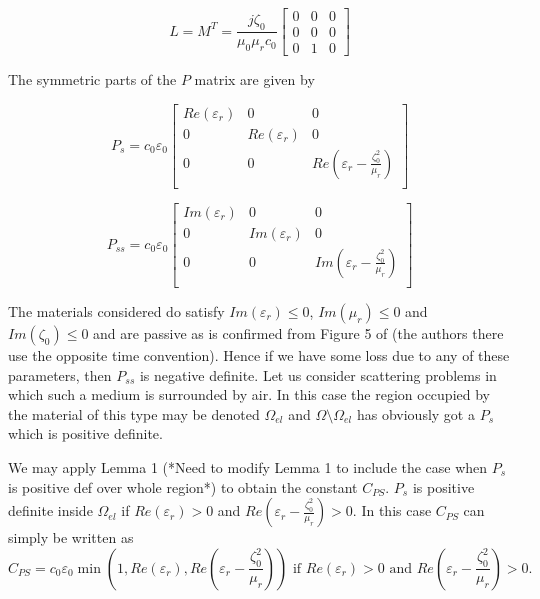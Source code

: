 \begin{equation} \label{constitutive_kraft_LM}
\tag{72}
L = M^T = \frac{j\zeta_0}{\mu_0\mu_rc_0}
\begin{bmatrix}
0 & 0 & 0 \\
0 & 0 & 0 \\
0 &  1  & 0
\end{bmatrix} 
\end{equation}

The symmetric parts of the $P$ matrix are given by 

\begin{equation}
\tag{73}
P_s =  c_0\varepsilon_0
\begin{bmatrix}
Re(\varepsilon_r) & 0 & 0 \\
0 & Re(\varepsilon_r) & 0 \\
0 & 0 & Re(\varepsilon_r - \frac{\zeta_0^2}{\mu_r}) \\
\end{bmatrix}
\end{equation}

\begin{equation}
\tag{74}
P_{ss} =  c_0\varepsilon_0
\begin{bmatrix}
Im(\varepsilon_r) & 0 & 0 \\
0 & Im(\varepsilon_r) & 0 \\
0 & 0 & Im(\varepsilon_r - \frac{\zeta_0^2}{\mu_r}) \\
\end{bmatrix}
\end{equation}

The materials considered do satisfy $Im(\varepsilon_r) \leq 0$, $Im(\mu_r) \leq 0$ and  $Im(\zeta_0) \leq 0$  
and are passive as is confirmed from Figure 5 of \cite{pendry2016acsphotonics} (the authors there use the opposite time convention).
Hence  if we have some loss due to any of these parameters, then $P_{ss}$ is negative definite.
Let us consider scattering problems in which such a medium is surrounded by air.
In this case the region occupied by the material of this type may be denoted $\Omega_{el}$ and 
$\Omega \setminus \Omega_{el}$ has obviously got a $P_s$ which is positive definite.

We may apply Lemma 1 (*Need to modify Lemma 1  to include the case when $P_s$ is positive def over whole region*) to obtain the constant $C_{PS}$.
$P_s$ is positive definite inside $\Omega_{el}$ if $Re(\varepsilon_r) >0$ and $Re(\varepsilon_r -\frac{\zeta_0^2}{\mu_r})  > 0$.
In this case $C_{PS}$ can simply be written as 
\begin{equation}
\tag{75}
C_{PS} = c_0\varepsilon_0\min(1,Re(\varepsilon_r), Re(\varepsilon_r -\frac{\zeta_0^2}{\mu_r}))  
\text{ if } Re(\varepsilon_r) > 0 \text{ and } Re(\varepsilon_r -\frac{\zeta_0^2}{\mu_r})  > 0.
\end{equation}

